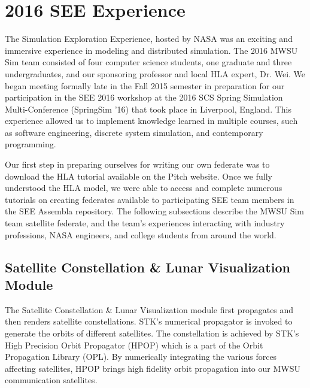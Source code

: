 \documentclass[journal, onecolumn]{IEEEtran}
\begin{document}
\section{2016 SEE Experience}
The Simulation Exploration Experience, hosted by NASA was an exciting and immersive experience in modeling and distributed simulation.  The 2016 MWSU Sim team consisted of four computer science students, one graduate and three undergraduates, and our sponsoring professor and local HLA expert, Dr. Wei.  We began meeting formally late in the Fall 2015 semester in preparation for our participation in the SEE 2016 workshop at the 2016 SCS Spring Simulation Multi-Conference (SpringSim '16) that took place in Liverpool, England.  This experience allowed us to implement knowledge learned in multiple courses, such as software engineering, discrete system simulation, and contemporary programming.

Our first step in preparing ourselves for writing our own federate was to download the HLA tutorial available on the Pitch website\cite{HLA}.  Once we fully understood the HLA model, we were able to access and complete numerous tutorials on creating federates available to participating SEE team members in the SEE Assembla repository. The following subsections describe the MWSU Sim team satellite federate, and the team's experiences interacting with industry professions, NASA engineers, and college students from around the world.

\subsection{Satellite Constellation \& Lunar Visualization Module}
The Satellite Constellation \& Lunar Visualization module first propagates and then renders satellite constellations. STK\rq{}s numerical propagator is invoked to generate the orbits of different satellites. The constellation is achieved by STK\rq{}s High Precision Orbit Propagator (HPOP) which is a part of the Orbit Propagation Library (OPL). By numerically integrating the various forces affecting satellites, HPOP brings high fidelity orbit propagation into our MWSU communication satellites.
\end{document}

